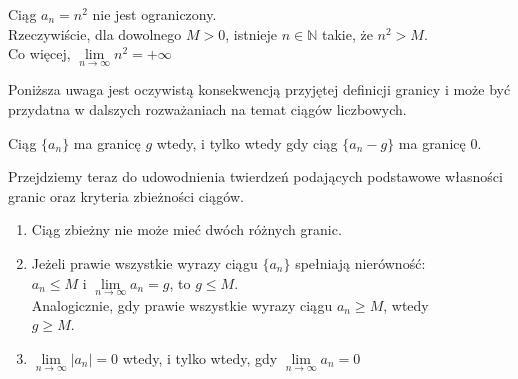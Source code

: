\begin{przyklad}
Ciąg $a_n=n^2$ nie jest ograniczony.\\
Rzeczywiście, dla dowolnego $M>0$, istnieje $n \in \mathbb{N}$ takie, że $n^2>M$. \\
Co więcej, $\lim\limits_{n \to \infty}{n^2}=+\infty$
\end{przyklad}
Poniższa uwaga jest oczywistą konsekwencją przyjętej definicji granicy i może być przydatna w dalszych rozważaniach na temat ciągów liczbowych.
\begin{cor}
Ciąg $\{a_n\}$ ma granicę $g$ wtedy, i tylko wtedy gdy ciąg $\{a_n-g\}$ ma granicę $0$.
\end{cor}
Przejdziemy teraz do udowodnienia twierdzeń podających podstawowe własności granic oraz kryteria zbieżności ciągów.
\begin{twierdzenie} 
\begin{enumerate}%
\item Ciąg zbieżny nie może mieć dwóch różnych granic.
\item Jeżeli prawie wszystkie wyrazy ciągu $\{a_n\}$ spełniają nierówność: \\
$a_n\leq M$ i $\lim\limits_{n \to \infty}{a_n}=g$, to $g\leq M$.\\ Analogicznie, gdy prawie wszystkie wyrazy ciągu $a_n\geq M$, wtedy\\
 $g\geq M$.
\item $\lim\limits_{n \to \infty}{|a_n|}= 0$ wtedy, i tylko wtedy, gdy $\lim\limits_{n \to \infty}{a_n}=0$
\end{enumerate}
\end{twierdzenie}
